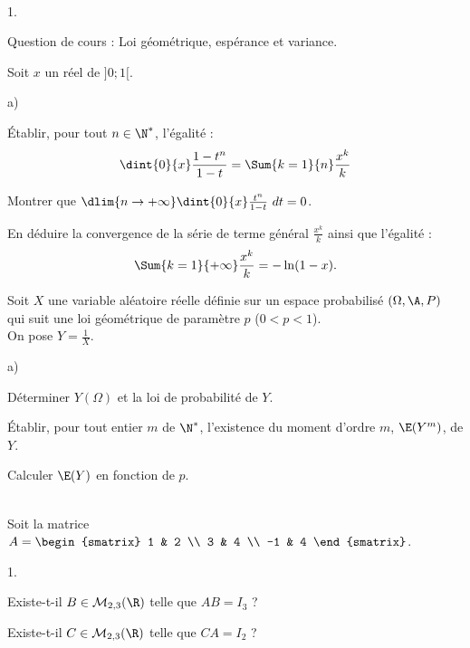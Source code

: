 \documentclass[11pt]{article}%
\begin{document}
\newpage

\begin{exerciceAP}~
  \begin{noliste}{1.}
    \setlength{\itemsep}{2mm}
  \item Question de cours : Loi géométrique, espérance et variance.
  \item Soit $x$ un réel de $]0 ; 1[$.
    \begin{noliste}{a)}
    \setlength{\itemsep}{2mm} 
    \item Établir, pour tout $n \in \N^*$, l'égalité :
      \[
      \dint{0}{x} \frac{1-t^n}{1-t} = \Sum{k=1}{n} \frac{x^k}{k}
      \]
    \item Montrer que $\dlim{n \rightarrow +\infty} \dint{0}{x}
      \frac{t^n}{1-t}\ dt = 0$.
    \item En déduire la convergence de la série de terme général
      $\frac{x^k}{k}$ ainsi que l'égalité :
      \[
      \Sum{k=1}{+\infty} \frac{x^k}{k} = - \ln (1-x).
      \]
    \end{noliste}
  \item Soit $X$ une variable aléatoire réelle définie sur un espace
    probabilisé $(\Omega , \A , P)$ qui suit une loi
    géométrique de paramètre $p$ ($0<p<1$). \\
    On pose $Y = \frac{1}{X}$.
    \begin{noliste}{a)}
    \setlength{\itemsep}{2mm}
    \item Déterminer $Y(\Omega)$ et la loi de probabilité de $Y$.
    \item Établir, pour tout entier $m$ de $\N^*$, l'existence du
      moment d'ordre $m$, $\E(Y^m)$, de $Y$.
    \item Calculer $\E(Y)$ en fonction de $p$.
    \end{noliste}
  \end{noliste}
\end{exerciceAP}


\begin{exerciceSP}~\\
  Soit la matrice $A = 
  \begin{smatrix} 
    1 & 2 \\ 
    3 & 4 \\ 
    -1 & 4
  \end{smatrix}$.
  \begin{noliste}{1.}
    \setlength{\itemsep}{2mm}
  \item Existe-t-il $B \in \mathcal{M}_{2,3} (\R)$ telle que $AB =
    I_3$ ?
  \item Existe-t-il $C \in \mathcal{M}_{2,3} (\R)$ telle que $CA =
    I_2$ ?
  \end{noliste}
\end{exerciceSP}
\end{document}
